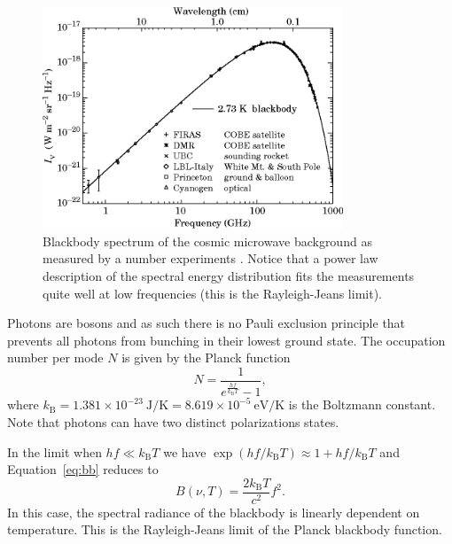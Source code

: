 \documentclass[a4paper,12pt]{article}
\theoremstyle{remark}
\newcommand{\mrm}[1]{\mathrm{#1}}
\renewcommand{\=}[1]{\stackrel{#1}{=}} %
\theoremstyle{plain}
\theoremstyle{definition}
\begin{document}
\begin{figure}[t]
\begin{center}
    \includegraphics*[angle=0,width=0.8\textwidth]{img/cmb_spectrum.png}
    \caption[Insert text]{Blackbody spectrum of the cosmic microwave background as measured by a number experiments \cite{Smoot1998}. Notice that a power law description of the spectral energy distribution fits the measurements quite well at low frequencies (this is the Rayleigh-Jeans limit).}
\label{fig:cmb_spectrum}
\end{center}
\end{figure}
 
Photons are bosons and as such there is no Pauli exclusion principle that prevents all photons from bunching in their lowest ground state. The occupation number per mode $N$ is given by the Planck function
\begin{equation}
N = \frac{1}{e^\frac{hf}{k_\mrm{B}T} - 1},
\end{equation}
where $k_\mrm{B} = 1.381 \times 10^{-23} \:\mrm{J/K} = 8.619 \times 10^{-5} \:\mrm{eV/K}$ is the Boltzmann constant. Note that photons can have two distinct polarizations states. 

In the limit when $hf \ll k_\mrm{B}T$ we have $\exp({hf/k_\mrm{B}T}) \approx 1 + hf/k_\mrm{B}T$ and Equation~\ref{eq:bb} reduces to
\begin{equation}
B(\nu, T) = \frac{2k_\mrm{B}T}{c^{2}}f^{2}.
\end{equation}
In this case, the spectral radiance of the blackbody is linearly dependent on temperature. This is the Rayleigh-Jeans limit of the Planck blackbody function.

\begingroup

\linespread{0.5}\selectfont

\endgroup
\end{document}
